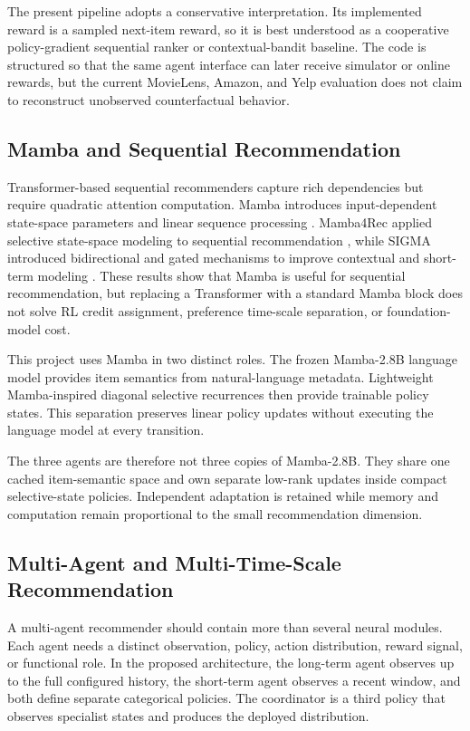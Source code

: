 \documentclass[11pt,a4paper]{article}
\begin{document}
The present pipeline adopts a conservative interpretation. Its implemented reward is a sampled next-item reward, so it is best understood as a cooperative policy-gradient sequential ranker or contextual-bandit baseline. The code is structured so that the same agent interface can later receive simulator or online rewards, but the current MovieLens, Amazon, and Yelp evaluation does not claim to reconstruct unobserved counterfactual behavior.

\subsection{Mamba and Sequential Recommendation}

Transformer-based sequential recommenders capture rich dependencies but require quadratic attention computation. Mamba introduces input-dependent state-space parameters and linear sequence processing \cite{MAMBA}. Mamba4Rec applied selective state-space modeling to sequential recommendation \cite{MAMBA4REC}, while SIGMA introduced bidirectional and gated mechanisms to improve contextual and short-term modeling \cite{SIGMA}. These results show that Mamba is useful for sequential recommendation, but replacing a Transformer with a standard Mamba block does not solve RL credit assignment, preference time-scale separation, or foundation-model cost.

This project uses Mamba in two distinct roles. The frozen Mamba-2.8B language model provides item semantics from natural-language metadata. Lightweight Mamba-inspired diagonal selective recurrences then provide trainable policy states. This separation preserves linear policy updates without executing the language model at every transition.

The three agents are therefore not three copies of Mamba-2.8B. They share one cached item-semantic space and own separate low-rank updates inside compact selective-state policies. Independent adaptation is retained while memory and computation remain proportional to the small recommendation dimension.

\subsection{Multi-Agent and Multi-Time-Scale Recommendation}

A multi-agent recommender should contain more than several neural modules. Each agent needs a distinct observation, policy, action distribution, reward signal, or functional role. In the proposed architecture, the long-term agent observes up to the full configured history, the short-term agent observes a recent window, and both define separate categorical policies. The coordinator is a third policy that observes specialist states and produces the deployed distribution.
\end{document}
